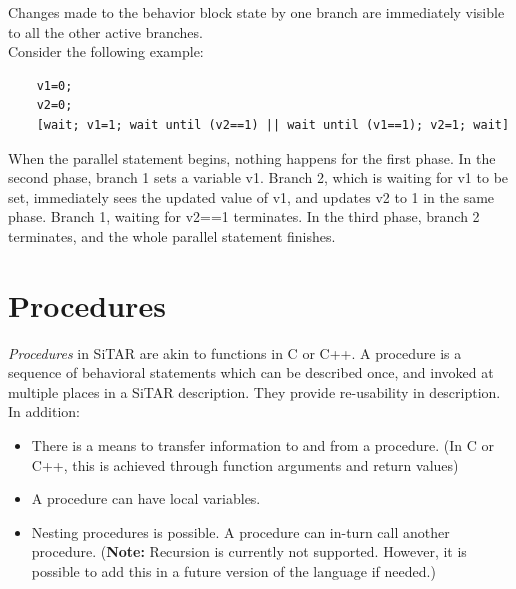 \documentclass[12pt,a4paper]{report}
\begin{document}
	Changes made to the behavior block state by one branch are immediately visible 
	to all the other active branches.\\

	Consider the following example:
	\begin{verbatim}
	v1=0;
	v2=0;
	[wait; v1=1; wait until (v2==1) || wait until (v1==1); v2=1; wait]
	\end{verbatim}

	When the parallel statement begins, nothing happens for the first phase.
	In the second phase, branch 1 sets a variable v1. 
	Branch 2, which is waiting for v1 to be set, 
	immediately sees the updated value of v1, 
	and updates v2 to 1 in the same phase. 
	Branch 1, waiting for v2==1 terminates.
	In the third phase, branch 2 terminates, 
	and the whole parallel statement finishes.
	
	
	
	
	\section{Procedures}\label{sec:procedures}
	
	\textit{Procedures} in SiTAR are akin to functions in C or C++. 
	A procedure is a sequence of behavioral statements which can be 
	described once, and invoked at multiple places in a SiTAR
	description. They provide re-usability in description. 
	In addition:
	\begin{itemize}
	\item There is a means to transfer information to and from a procedure.
	(In C or C++, this is achieved through function arguments and return values)
	\item A procedure can have local variables.
	\item Nesting procedures is possible. A procedure can
	in-turn call another procedure. (\textbf{Note:} Recursion is
	currently not supported. However, it is possible to add this in a
	future version of the language if needed.)
	\end{itemize}

	
\end{document}
